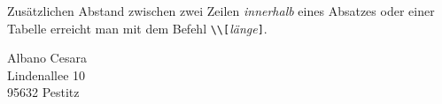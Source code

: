 Zusätzlichen Abstand zwischen zwei Zeilen \emph{innerhalb}
eines Absatzes oder einer Tabelle erreicht man mit dem Befehl
\lstinline|\\[|\textit{länge}\lstinline|]|.

\begin{LTXexample}
Albano Cesara \\
Lindenallee 10 \\[1.5ex]
95632 Pestitz
\end{LTXexample}





\endinput

